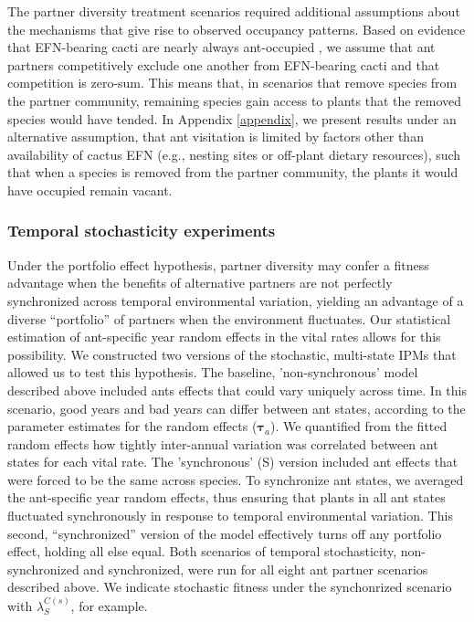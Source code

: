 \documentclass[11pt]{article}
\begin{document}
The partner diversity treatment scenarios required additional assumptions about the mechanisms that give rise to observed occupancy patterns. 
Based on evidence that EFN-bearing cacti are nearly always ant-occupied \citep{Miller2014}, we assume that ant partners competitively exclude one another from EFN-bearing cacti and that competition is zero-sum. 
This means that, in scenarios that remove species from the partner community, remaining species gain access to plants that the removed species would have tended. 
In Appendix \ref{appendix}, we present results under an alternative assumption, that ant visitation is limited by factors other than availability of cactus EFN (e.g., nesting sites or off-plant dietary resources), such that when a species is removed from the partner community, the plants it would have occupied remain vacant. 

\subsubsection*{Temporal stochasticity experiments}
Under the portfolio effect hypothesis, partner diversity may confer a fitness advantage when the benefits of alternative partners are not perfectly synchronized across temporal environmental variation, yielding an advantage of a diverse ``portfolio'' of partners when the environment fluctuates. 
Our statistical estimation of ant-specific year random effects in the vital rates allows for this possibility. 
We constructed two versions of the stochastic, multi-state IPMs that allowed us to test this hypothesis.
The baseline, 'non-synchronous' model described above included ants effects that could vary uniquely across time. 
In this scenario, good years and bad years can differ between ant states, according to the parameter estimates for the random effects ($\pmb{\tau}_{a}$). 
We quantified from the fitted random effects how tightly inter-annual variation was correlated between ant states for each vital rate.
The 'synchronous' (S) version included  ant effects that were forced to be the same across species. 
To synchronize ant states, we averaged the ant-specific year random effects, thus ensuring that plants in all ant states fluctuated synchronously in response to temporal environmental variation. 
This second, ``synchronized'' version of the model effectively turns off any portfolio effect, holding all else equal. 
Both scenarios of temporal stochasticity, non-synchronized and synchronized, were run for all eight ant partner scenarios described above. 
We indicate stochastic fitness under the synchonrized scenario with $\lambda^{C(s)}_{S}$, for example. 
\end{document}
